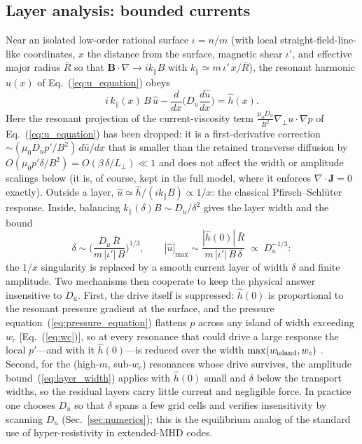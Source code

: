 \documentclass[english]{article}
\newcommand{\bB}{\mathbf{B}}
\newcommand{\bJ}{\mathbf{J}}
\newcommand{\gradperp}{\nabla_{\!\perp}}
\begin{document}
\subsection{Layer analysis: bounded currents}
\label{sec:layer}

Near an isolated low-order rational surface $\iota=n/m$ (with local straight-field-line-like
coordinates, $x$ the distance from the surface, magnetic shear $\iota'$, and effective major radius
$\bar R$ so that $\bB\cdot\nabla\rightarrow ik_\parallel B$ with
$k_\parallel\simeq m\,\iota'\,x/\bar R$), the resonant harmonic $\hat u(x)$ of
Eq.~(\ref{eq:u_equation}) obeys
\begin{equation}
i\,k_\parallel(x)\,B\,\hat u-\frac{d}{dx}\Big(D_u\frac{d\hat u}{dx}\Big)=\hat h(x) .
\label{eq:layer_equation}
\end{equation}
Here the resonant projection of the current-viscosity term
$\tfrac{\mu_0 D_u}{B^{2}}\gradperp u\cdot\nabla p$ of Eq.~(\ref{eq:u_equation}) has been dropped: it
is a first-derivative correction $\sim(\mu_0 D_u p'/B^{2})\,d\hat u/dx$ that is smaller than the
retained transverse diffusion by $O(\mu_0 p'\delta/B^{2})=O(\beta\,\delta/L_\perp)\ll1$ and does not
affect the width or amplitude scalings below (it is, of course, kept in the full model, where it
enforces $\nabla\cdot\bJ=0$ exactly). Outside a layer, $\hat u\simeq\hat h/(ik_\parallel B)\propto1/x$: the classical
Pfirsch--Schl\"uter response. Inside, balancing $k_\parallel(\delta)B\sim D_u/\delta^{2}$ gives the
layer width and the bound
\begin{equation}
\delta\sim\Big(\frac{D_u\,\bar R}{m\,|\iota'|\,B}\Big)^{1/3},
\qquad
|\hat u|_{\max}\sim\frac{|\hat h(0)|\,\bar R}{m\,|\iota'|\,B\,\delta}\;\propto\;D_u^{-1/3} :
\label{eq:layer_width}
\end{equation}
the $1/x$ singularity is replaced by a smooth current layer of width $\delta$ and finite amplitude.
Two mechanisms then cooperate to keep the physical answer insensitive to $D_u$. First, the drive
itself is suppressed: $\hat h(0)$ is proportional to the resonant pressure gradient at the surface,
and the pressure equation~(\ref{eq:pressure_equation}) flattens $p$ across any island of width
exceeding $w_c$ [Eq.~(\ref{eq:wc})], so at every resonance that could drive a large response the
local $p'$---and with it $\hat h(0)$---is reduced over the width $\max(w_{\rm island},w_c)$
\cite{fitzpatrick1995,krommes2009}. Second, for the (high-$m$, sub-$w_c$) resonances whose drive
survives, the amplitude bound~(\ref{eq:layer_width}) applies with $\hat h(0)$ small and $\delta$
below the transport widths, so the residual layers carry little current and negligible force. In
practice one chooses $D_u$ so that $\delta$ spans a few grid cells and verifies insensitivity by
scanning $D_u$ (Sec.~\ref{sec:numerics}); this is the equilibrium analog of the standard use of
hyper-resistivity in extended-MHD codes.
\end{document}
